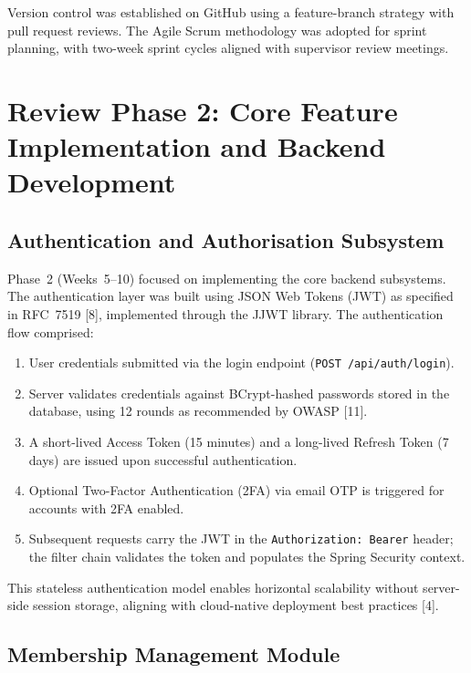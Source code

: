 \documentclass[
  12pt,
  a4paperpaper,
]{report}
\begin{document}
Version control was established on GitHub using a feature-branch
strategy with pull request reviews. The Agile Scrum methodology was
adopted for sprint planning, with two-week sprint cycles aligned
with supervisor review meetings.


\section{Review Phase 2: Core Feature Implementation and Backend
Development}\label{review-phase-2}

\subsection{Authentication and Authorisation
Subsystem}\label{authentication-subsystem}

Phase~2 (Weeks~5--10) focused on implementing the core backend
subsystems. The authentication layer was built using JSON Web Tokens
(JWT) as specified in RFC~7519 {[}8{]}, implemented
through the JJWT library. The authentication flow comprised:

\begin{enumerate}
\def\labelenumi{\arabic{enumi}.}
\item User credentials submitted via the login endpoint
  (\texttt{POST /api/auth/login}).
\item Server validates credentials against BCrypt-hashed passwords
  stored in the database, using 12 rounds as recommended by OWASP
  {[}11{]}.
\item A short-lived Access Token (15 minutes) and a long-lived
  Refresh Token (7 days) are issued upon successful authentication.
\item Optional Two-Factor Authentication (2FA) via email OTP is
  triggered for accounts with 2FA enabled.
\item Subsequent requests carry the JWT in the
  \texttt{Authorization: Bearer} header; the filter chain validates
  the token and populates the Spring Security context.
\end{enumerate}

This stateless authentication model enables horizontal scalability
without server-side session storage, aligning with cloud-native
deployment best practices {[}4{]}.

\subsection{Membership Management
Module}\label{membership-management-module}
\end{document}
